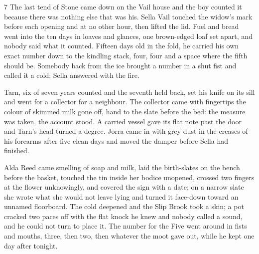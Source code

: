 




\CRtailpiece
\begin{CRchronicle}{7}
The last tend of Stone came down on the Vail house and the boy counted it because there was nothing else that was his. Sella Vail touched the widow’s mark before each opening and at no other hour, then lifted the lid. Fuel and bread went into the ten days in loaves and glances, one brown-edged loaf set apart, and nobody said what it counted. Fifteen days old in the fold, he carried his own exact number down to the kindling stack, four, four and a space where the fifth should be. Somebody back from the ice brought a number in a shut fist and called it a cold; Sella answered with the fire.

Tarn, six of seven years counted and the seventh held back, set his knife on its sill and went for a collector for a neighbour. The collector came with fingertips the colour of skimmed milk gone off, hand to the slate before the bed: the measure was taken, the account stood. A carried vessel gave its flat note past the door and Tarn’s head turned a degree. Jorra came in with grey dust in the creases of his forearms after five clean days and moved the damper before Sella had finished.

Alda Reed came smelling of soap and milk, laid the birth-slates on the bench before the basket, touched the tin inside her bodice unopened, crossed two fingers at the flower unknowingly, and covered the sign with a date; on a narrow slate she wrote what she would not leave lying and turned it face-down toward an unnamed floorboard. The cold deepened and the Slip Brook took a skin; a pot cracked two paces off with the flat knock he knew and nobody called a sound, and he could not turn to place it. The number for the Five went around in fists and mouths, three, then two, then whatever the moot gave out, while he kept one day after tonight.


\end{CRchronicle}
